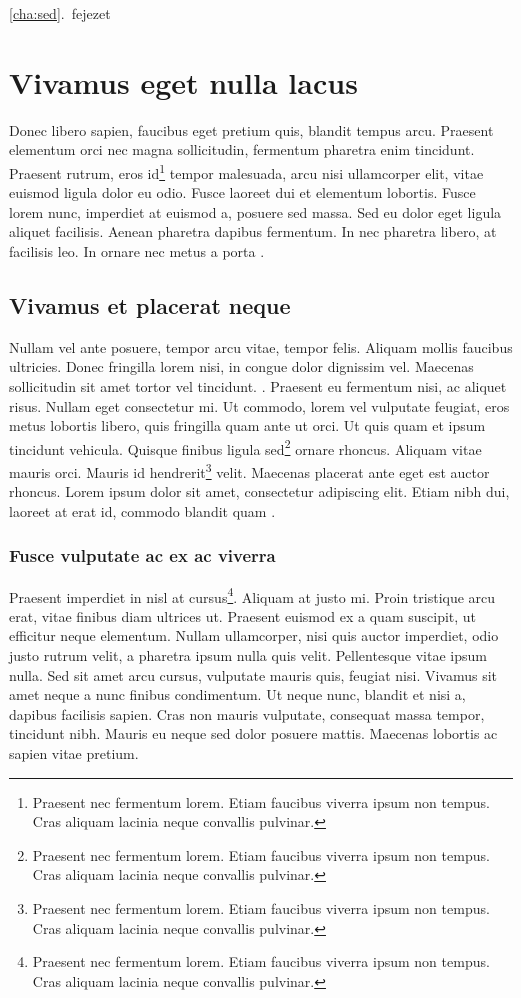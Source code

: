 \documentclass[a4paper,12pt,draft]{report}
\begin{document}
\ref{cha:sed}.~fejezet

\section{Vivamus eget nulla lacus}

Donec libero sapien, faucibus eget pretium quis, blandit tempus arcu. Praesent elementum orci nec magna sollicitudin, fermentum pharetra enim tincidunt. Praesent rutrum, eros id\footnote{Praesent nec fermentum lorem. Etiam faucibus viverra ipsum non tempus. Cras aliquam lacinia neque convallis pulvinar.} tempor malesuada, arcu nisi ullamcorper elit, vitae euismod ligula dolor eu odio.  Fusce laoreet dui et elementum lobortis. Fusce lorem nunc, imperdiet at euismod a, posuere sed massa. Sed eu dolor eget ligula aliquet facilisis. Aenean pharetra dapibus fermentum. In nec pharetra libero, at facilisis leo. In ornare nec metus a porta \citep[See][and references therein]{facsko2022_ssr}.

\subsection{Vivamus et placerat neque}

\citet{facsko2022_ssr} Nullam vel ante posuere, tempor arcu vitae, tempor felis. Aliquam mollis faucibus ultricies. Donec fringilla lorem nisi, in congue dolor dignissim vel. Maecenas sollicitudin sit amet tortor vel tincidunt. . Praesent eu fermentum nisi, ac aliquet risus. Nullam eget consectetur mi. Ut commodo, lorem vel vulputate feugiat, eros metus lobortis libero, quis fringilla quam ante ut orci. Ut quis quam et ipsum tincidunt vehicula. Quisque finibus ligula sed\footnote{Praesent nec fermentum lorem. Etiam faucibus viverra ipsum non tempus. Cras aliquam lacinia neque convallis pulvinar.} ornare rhoncus. Aliquam vitae mauris orci. Mauris id hendrerit\footnote{Praesent nec fermentum lorem. Etiam faucibus viverra ipsum non tempus. Cras aliquam lacinia neque convallis pulvinar.} velit. Maecenas placerat ante eget est auctor rhoncus. Lorem ipsum dolor sit amet, consectetur adipiscing elit. Etiam nibh dui, laoreet at erat id, commodo blandit quam \citep{janhunen2012gumics}.

\subsubsection{Fusce vulputate ac ex ac viverra}

Praesent imperdiet in nisl at cursus\footnote{Praesent nec fermentum lorem. Etiam faucibus viverra ipsum non tempus. Cras aliquam lacinia neque convallis pulvinar.}.  Aliquam at justo mi. Proin tristique arcu erat, vitae finibus diam ultrices ut. Praesent euismod ex a quam suscipit, ut efficitur neque elementum. Nullam ullamcorper, nisi quis auctor imperdiet, odio justo rutrum velit, a pharetra ipsum nulla quis velit. Pellentesque vitae ipsum nulla. Sed sit amet arcu cursus, vulputate mauris quis, feugiat nisi. Vivamus sit amet neque a nunc finibus condimentum. Ut neque nunc, blandit et nisi a, dapibus facilisis sapien. Cras non mauris vulputate, consequat massa tempor, tincidunt nibh. Mauris eu neque sed dolor posuere mattis. Maecenas lobortis ac sapien vitae pretium.
\end{document}
